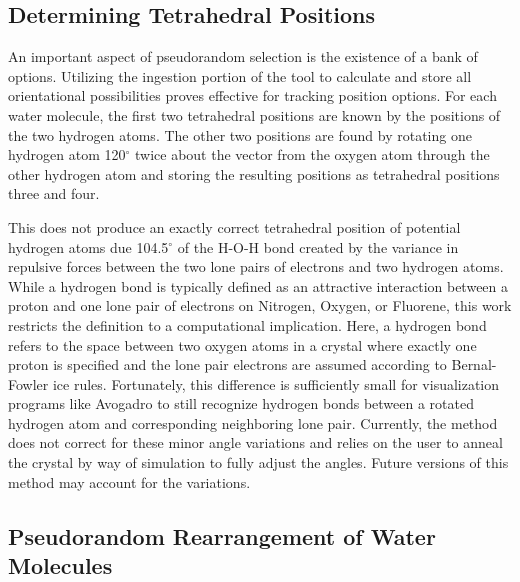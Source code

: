 \subsection{Determining Tetrahedral Positions}

An important aspect of pseudorandom selection is the existence of a bank of options.
Utilizing the ingestion portion of the tool to calculate and store all orientational possibilities proves effective for tracking position options.
For each water molecule, the first two tetrahedral positions are known by the positions of the two hydrogen atoms. 
The other two positions are found by rotating one hydrogen atom 120$^{\circ}$ twice about the vector from the oxygen atom through the other hydrogen atom and storing the resulting positions as tetrahedral positions three and four. 

This does not produce an exactly correct tetrahedral position of potential hydrogen atoms due 104.5$^{\circ}$ of the H-O-H bond created by the variance in repulsive forces between the two lone pairs of electrons and two hydrogen atoms. 
While a hydrogen bond is typically defined as an attractive interaction between a proton and one lone pair of electrons on Nitrogen, Oxygen, or Fluorene, this work restricts the definition to a computational implication.
Here, a hydrogen bond refers to the space between two oxygen atoms in a crystal where exactly one proton is specified and the lone pair electrons are assumed according to Bernal-Fowler ice rules. 
Fortunately, this difference is sufficiently small for visualization programs like Avogadro to still recognize hydrogen bonds between a rotated hydrogen atom and corresponding neighboring lone pair. 
Currently, the method does not correct for these minor angle variations and relies on the user to anneal the crystal by way of simulation to fully adjust the angles. 
Future versions of this method may account for the variations.

\subsection{Pseudorandom Rearrangement of Water Molecules}

